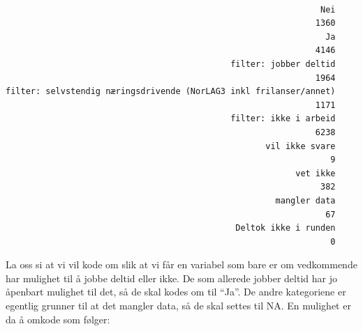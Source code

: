 \documentclass[
  letterpaper,
  DIV=11,
  numbers=noendperiod]{scrreprt}
\newenvironment{Shaded}{\begin{snugshade}}{\end{snugshade}}
\newcommand{\FunctionTok}[1]{\textcolor[rgb]{0.28,0.35,0.67}{#1}}
\newcommand{\NormalTok}[1]{\textcolor[rgb]{0.00,0.23,0.31}{#1}}
\newcommand{\SpecialCharTok}[1]{\textcolor[rgb]{0.37,0.37,0.37}{#1}}
\theoremstyle{definition}
\theoremstyle{remark}
\begin{document}
\begin{Shaded}
\end{Shaded}

\begin{verbatim}

                                                               Nei 
                                                              1360 
                                                                Ja 
                                                              4146 
                                             filter: jobber deltid 
                                                              1964 
filter: selvstendig næringsdrivende (NorLAG3 inkl frilanser/annet) 
                                                              1171 
                                             filter: ikke i arbeid 
                                                              6238 
                                                    vil ikke svare 
                                                                 9 
                                                          vet ikke 
                                                               382 
                                                      mangler data 
                                                                67 
                                              Deltok ikke i runden 
                                                                 0 
\end{verbatim}

La oss si at vi vil kode om slik at vi får en variabel som bare er om
vedkommende har mulighet til å jobbe deltid eller ikke. De som allerede
jobber deltid har jo åpenbart mulighet til det, så de skal kodes om til
``Ja''. De andre kategoriene er egentlig grunner til at det mangler
data, så de skal settes til NA. En mulighet er da å omkode som følger:
\end{document}
